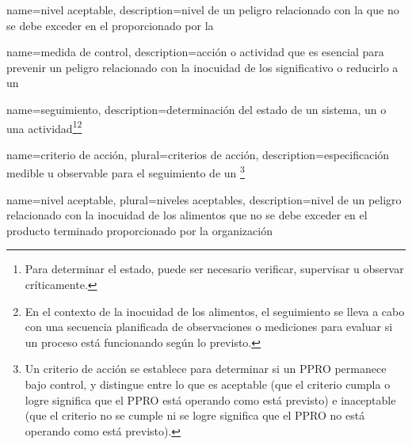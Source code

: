 {
    name=nivel aceptable,
    description={nivel de un peligro relacionado con la  que no se debe exceder en el  proporcionado por la }
}

{
    name=medida de control,
    description={acción o actividad que es esencial para prevenir un peligro relacionado con la inocuidad de los   significativo o reducirlo a un }
}

{
    name=seguimiento,
    description={determinación del estado de un sistema, un  o una actividad\footnote{Para determinar el estado, puede ser necesario verificar, supervisar u observar críticamente.}\footnote{En el contexto de la inocuidad de los alimentos, el seguimiento se lleva a cabo con una secuencia planificada de observaciones o mediciones para evaluar si un proceso está funcionando según lo previsto.}}
}

{
    name=criterio de acción,
    plural={criterios de acción},
    description={especificación medible u observable para el seguimiento de un \footnote{Un criterio de acción se establece para determinar si un PPRO permanece bajo control, y distingue entre lo que es aceptable (que el criterio cumpla o logre significa que el PPRO está operando como está previsto) e inaceptable (que el criterio no se cumple ni se logre significa que el PPRO no está operando como está previsto).}}
}

{
    name=nivel aceptable,
    plural={niveles aceptables},
    description={nivel de un peligro relacionado con la inocuidad de los alimentos que no se debe exceder en el producto terminado proporcionado por la organización}
}







